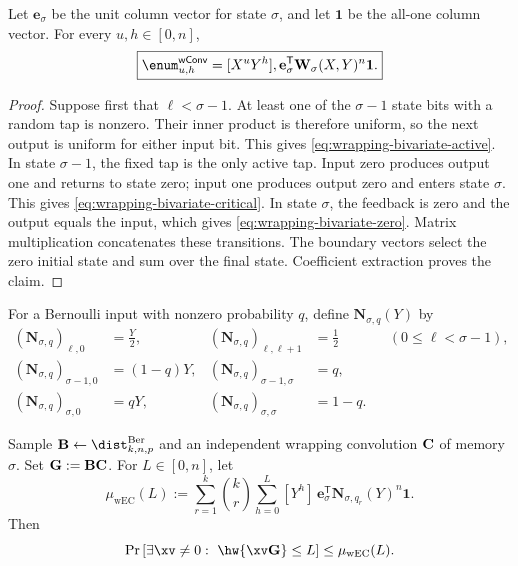 \begin{lemma}
\label{lem:wrapping-transfer-enumerator}
Let $\mathbf e_\sigma$ be the unit column vector for state $\sigma$, and let
$\mathbf 1$ be the all-one column vector.  For every $u,h\in[0,n]$,
\begin{equation}
 \boxed{
 \enum^{\textsf{wConv}}_{u,h}
   =[X^uY^h],\mathbf e_\sigma^\mathsf{T}
     \mathbf W_\sigma(X,Y)^n\mathbf 1.
 }
 \label{eq:wrapping-transfer-enumerator}
\end{equation}
\end{lemma}

\begin{proof}
Suppose first that $\ell<\sigma-1$.  At least one of the $\sigma-1$ state
bits with a random tap is nonzero.  Their inner product is therefore uniform,
so the next output is uniform for either input bit.  This gives
\eqref{eq:wrapping-bivariate-active}.  In state $\sigma-1$, the fixed tap is
the only active tap.  Input zero produces output one and returns to state zero;
input one produces output zero and enters state $\sigma$.  This gives
\eqref{eq:wrapping-bivariate-critical}.  In state $\sigma$, the feedback is
zero and the output equals the input, which gives
\eqref{eq:wrapping-bivariate-zero}.  Matrix multiplication concatenates these
transitions.  The boundary vectors select the zero initial state and sum over
the final state.  Coefficient extraction proves the claim.
\end{proof}

For a Bernoulli input with nonzero probability $q$, define
$\mathbf N_{\sigma,q}(Y)$ by
\begin{align}
 (\mathbf N_{\sigma,q})_{\ell,0}
   &=\frac{Y}{2},
 &
 (\mathbf N_{\sigma,q})_{\ell,\ell+1}
   &=\frac{1}{2}
 &&(0\leq\ell<\sigma-1),
 \label{eq:wrapping-message-active}\\
 (\mathbf N_{\sigma,q})_{\sigma-1,0}
   &=(1-q)Y,
 &
 (\mathbf N_{\sigma,q})_{\sigma-1,\sigma}
   &=q,
 \label{eq:wrapping-message-critical}\\
 (\mathbf N_{\sigma,q})_{\sigma,0}
   &=qY,
 &
 (\mathbf N_{\sigma,q})_{\sigma,\sigma}
   &=1-q.
 \label{eq:wrapping-message-zero}
\end{align}

\begin{theorem}
\label{thm:wrapped-expand-convolute-first-moment}
Sample $\B\gets\dist^{\mathrm{Ber}}_{k,n,p}$ and an independent wrapping
convolution $\mathbf C$ of memory $\sigma$.  Set $\mathbf G:=\mathbf B\mathbf C$.  For $L\in[0,n]$, let
\begin{equation}
 \mu_{\mathrm{wEC}}(L)
   :=\sum_{r=1}^{k}\binom{k}{r}
     \sum_{h=0}^{L}[Y^h]\,
     \mathbf e_\sigma^\mathsf{T}
     \mathbf N_{\sigma,q_r}(Y)^n\mathbf 1.
 \label{eq:wrapped-expand-convolute-first-moment}
\end{equation}
Then
\begin{equation}
 \Pr\left[\exists\xv\neq0:\ \hw{\xv\G}\leq L\right]
 \leq \mu_{\mathrm{wEC}}(L).
 \label{eq:wrapped-expand-convolute-failure}
\end{equation}
\end{theorem}

